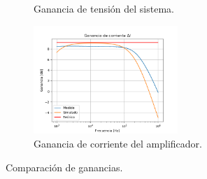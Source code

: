 \begin{figure}[H]
\begin{subfigure}{.49\textwidth}
	\caption{Ganancia de tensión del sistema.}
	\label{fig:avs}
\end{subfigure}
\begin{subfigure}{.8\textwidth}
\centering
	\includegraphics[width=0.6\textwidth]{Imagenes/Ai.png}
	\caption{Ganancia de corriente del amplificador.}
	\label{fig:ai}
\end{subfigure}
\caption{Comparación de ganancias.}
\label{fig:ganancias}
\end{figure}

